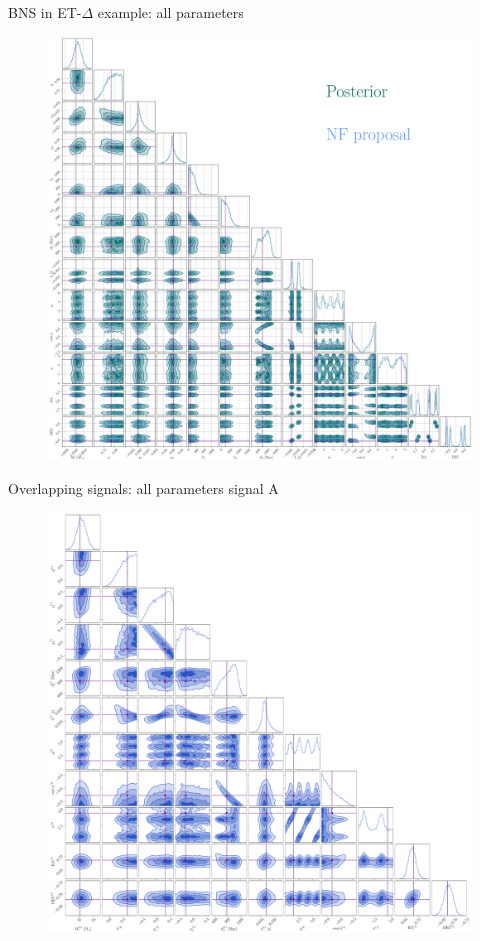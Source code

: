 \documentclass[usenames,dvipsnames,t]{beamer}
\begin{document}
\begin{frame}{BNS in ET-$\Delta$ example: all parameters}
  \vspace{-3mm}
  \begin{figure}
    \centering
    \includegraphics[scale=0.1125]{Figures/corner_plot_big.pdf}
  \end{figure}
\end{frame}

\begin{frame}{Overlapping signals: all parameters signal A}
  \vspace{-3mm}
  \begin{figure}
    \centering
    \includegraphics[scale=0.1325]{Figures/OS_injection_139_v2_1_cornerplot_all.pdf}
  \end{figure}
\end{frame}
\end{document}
